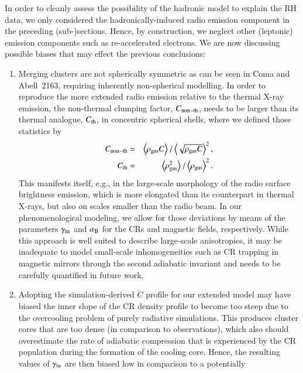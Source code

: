 \documentclass[useAMS,usenatbib]{mn2e}
\newcommand{\expval}[1]{\left\langle #1 \right\rangle}
\begin{document}
In order to cleanly assess the possibility of the hadronic model to explain the
RH data, we only considered the hadronically-induced radio emission
component in the preceding (sub-)sections. Hence, by construction, we neglect
other (leptonic) emission components such as re-accelerated electrons. We are
now discussing possible biases that may effect the previous conclusions:

\begin{enumerate} 
\item Merging clusters are not spherically symmetric as can be seen in Coma and
  Abell~2163, requiring inherently non-spherical modelling. In order to
  reproduce the more extended radio emission relative to the thermal X-ray
  emission, the non-thermal clumping factor, $C_{{\mathrm{non-th}}}$, needs to be
  larger than its thermal analogue, $C_{{\mathrm{th}}}$, in concentric spherical
  shells, where we defined those statistics by
  \begin{eqnarray}
    \label{eq:clumping}
    C_{\rmn{non-th}} &=&
    \expval{\rho_\rmn{gas} C}/\expval{\sqrt{\rho_\rmn{gas} C}}^2,\\
    C_{\rmn{th}} &=& 
    \expval{\rho_\rmn{gas}^2}/\expval{\rho_\rmn{gas}}^2.
  \end{eqnarray}
  This manifests itself, e.g., in the large-scale morphology of the radio
  surface brightness emission, which is more elongated than its counterpart in
  thermal X-rays, but also on scales smaller than the radio beam. In our
  phenomenological modeling, we allow for those deviations by means of the
  parameters $\gamma_{{\mathrm{tu}}}$ and $ \alpha_{{\mathrm{B}}}$ for the CRs and magnetic fields,
  respectively. While this approach is well suited to describe large-scale
  anisotropies, it may be inadequate to model small-scale inhomogeneities such
  as CR trapping in magnetic mirrors through the second adiabatic invariant and
  needs to be carefully quantified in future work.
\item Adopting the simulation-derived $\tilde{C}$ profile
  \citep{2010MNRAS.409..449P} for our extended model may have biased the inner
  slope of the CR density profile to become too steep due to the overcooling
  problem of purely radiative simulations. This produces cluster cores that are
  too dense (in comparison to observations), which also should overestimate the
  rate of adiabatic compression that is experienced by the CR population during
  the formation of the cooling core. Hence, the resulting values of
  $\gamma_{{\mathrm{tu}}}$ are then biased low in comparison to a potentially

\end{enumerate}
\end{document}

